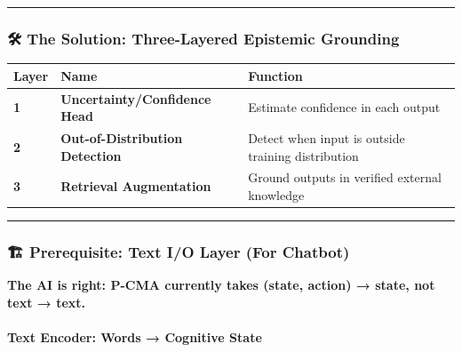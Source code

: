 \documentclass[
  11pt,
  a4paper,
]{article}
\begin{document}
\begin{center}\rule{0.5\linewidth}{0.5pt}\end{center}

\subsubsection{🛠️ The Solution: Three-Layered Epistemic
Grounding}\label{the-solution-three-layered-epistemic-grounding}

\begin{longtable}[]{@{}
  >{\raggedright\arraybackslash}p{}
  >{\raggedright\arraybackslash}p{}
  >{\raggedright\arraybackslash}p{}@{}}
\toprule\noalign{}
\begin{minipage}[b]{\linewidth}\raggedright
Layer
\end{minipage} & \begin{minipage}[b]{\linewidth}\raggedright
Name
\end{minipage} & \begin{minipage}[b]{\linewidth}\raggedright
Function
\end{minipage} \\
\midrule\noalign{}
\endhead
\bottomrule\noalign{}
\endlastfoot
\textbf{1} & \textbf{Uncertainty/Confidence Head} & Estimate confidence
in each output \\
\textbf{2} & \textbf{Out-of-Distribution Detection} & Detect when input
is outside training distribution \\
\textbf{3} & \textbf{Retrieval Augmentation} & Ground outputs in
verified external knowledge \\
\end{longtable}

\begin{center}\rule{0.5\linewidth}{0.5pt}\end{center}

\subsubsection{🏗️ Prerequisite: Text I/O Layer (For
Chatbot)}\label{prerequisite-text-io-layer-for-chatbot}

\textbf{The AI is right: P-CMA currently takes (state, action) → state,
not text → text.}

\paragraph{Text Encoder: Words → Cognitive
State}\label{text-encoder-words-cognitive-state}
\end{document}
